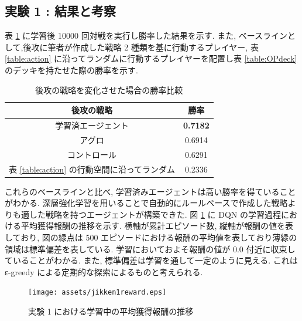 \documentclass[12pt]{jarticle}
\begin{document}
\subsection{実験 1 : 結果と考察}
表 \ref{table:winratejikken1} に学習後 10000 回対戦を実行し勝率した結果を示す. また, ベースラインとして,後攻に筆者が作成した戦略 2 種類を基に行動するプレイヤー, 表 \ref{table:action} に沿ってランダムに行動するプレイヤーを配置し表 \ref{table:OPdeck} のデッキを持たせた際の勝率を示す. 
\begin{table}[ht]
  \centering
  \caption{後攻の戦略を変化させた場合の勝率比較}
  \label{table:winratejikken1}
  \begin{tabular}{|c|c|}
  \hline
  後攻の戦略        & 勝率     \\ \hline \hline
  学習済エージェント    & \textbf{0.7182} \\ \hline
  アグロ          & 0.6914 \\ \hline
  コントロール       & 0.6291 \\ \hline
  表 \ref{table:action} の行動空間に沿ってランダム & 0.2336       \\ \hline
  \end{tabular}
  \end{table}
  これらのベースラインと比べ, 学習済みエージェントは高い勝率を得ていることがわかる. 深層強化学習を用いることで自動的にルールベースで作成した戦略よりも適した戦略を持つエージェントが構築できた.
  図 \ref{fig:jikken1reward} に DQN の学習過程における平均獲得報酬の推移を示す. 横軸が累計エピソード数, 縦軸が報酬の値を表しており, 図の緑点は 500 エピソードにおける報酬の平均値を表しており薄緑の領域は標準偏差を表している. 学習においておよそ報酬の値が 0.0 付近に収束していることがわかる. また, 標準偏差は学習を通して一定のように見える. これは ε-greedy による定期的な探索によるものと考えられる.
  \begin{figure}[ht]
    \centering
    \texttt{[image: assets/jikken1reward.eps]}
    \vspace{-0.3cm}
    \caption{実験 1 における学習中の平均獲得報酬の推移}
    \label{fig:jikken1reward}
  \end{figure}
  
\end{document}
